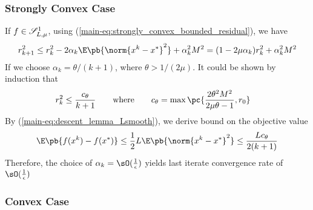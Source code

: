 \documentclass[../summary.tex]{subfiles}
\begin{document}
\subsubsection{Strongly Convex Case}

If $f\in\mathscr{S}_{L,\mu}^1$, using (\ref{main-eq:strongly_convex_bounded_residual}), we have
\begin{align*}
    r_{k+1}^2
        \leq r_k^2 - 2\alpha_k \E\pb{\norm{x^k-x^*}^2} + \alpha_k^2 M^2
        = (1-2\mu \alpha_k ) r_k^2 + \alpha_k^2M^2
\end{align*}
If we choose $\alpha_k = \theta/(k+1)$, where $\theta > 1/(2\mu)$. It could be shown by induction that \cite{nemirovskiRobustStochasticApproximation2009}
\begin{align*}
    r_k^2
        &\leq \frac{c_{\theta}}{k+1}
            \quad\quad\text{where}\quad\quad
            c_{\theta} = \max\pc{
                \frac{2\theta^2M^2}{2\mu\theta - 1}, r_0
            }
\end{align*}
By (\ref{main-eq:descent_lemma_Lsmooth}), we derive bound on the objective value
\begin{align*}
    \E\pb{f(x^k) - f(x^*)}
        \leq \frac{1}{2} L \E\pb{\norm{x^k-x^*}^2}
        \leq \frac{Lc_{\theta}}{2(k+1)}
\end{align*}
Therefore, the choice of $\alpha_k=\sO(\frac{1}{\epsilon})$ yields last iterate convergence rate of $\sO(\frac{1}{\epsilon})$


\subsubsection{Convex Case}
\end{document}
